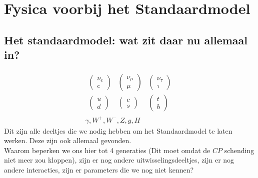 \documentclass[../main.tex]{subfiles}
\begin{document}
\section{Fysica voorbij het Standaardmodel}%
\label{sec:fysica_voorbij_het_standaard_model}

\subsection{Het standaardmodel: wat zit daar nu allemaal in?}%
\label{sub:het_standaard_model_wat_zit_daar_nu_allemaal_in_}

\begin{equation}
    \begin{aligned}
        \label{eq:standaard_model}
            \begin{array}{ccc}
                \left(\begin{array}{c}
                        \nu_{e} \\
                        e
                        \end{array}\right) & \left(\begin{array}{c}
                        \nu_{\mu} \\
                        \mu
                        \end{array}\right) & \left(\begin{array}{c}
                        \nu_{\tau} \\
                        \tau
                \end{array}\right) \\
                \left(\begin{array}{l}
                        u \\
                        d
                        \end{array}\right) & \left(\begin{array}{l}
                        c \\
                        s
                        \end{array}\right) & \left(\begin{array}{l}
                        t \\
                        b
                \end{array}\right)
            \end{array}\\
            \gamma, W^{+}, W^{-}, Z, g, H
    \end{aligned}
\end{equation}
Dit zijn alle deeltjes die we nodig hebben om het Standaardmodel te laten werken. Deze zijn ook allemaal gevonden.\\
Waarom beperken we ons hier tot 4 generaties (Dit moet omdat de $CP$ schending niet meer zou kloppen), zijn er nog andere uitwisselingsdeeltjes, zijn er nog andere interacties, zijn er parameters die we nog niet kennen?
\end{document}
